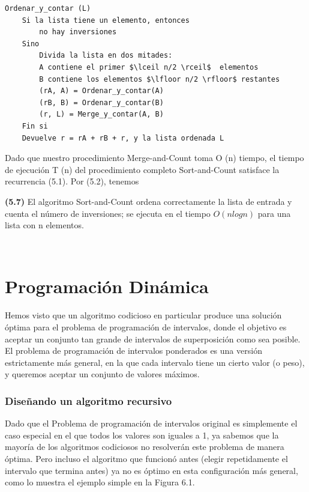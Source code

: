 \documentclass[a4paper, 12pt]{book}
\theoremstyle{dotless}
\begin{document}
\begin{lstlisting}
Ordenar_y_contar (L)
    Si la lista tiene un elemento, entonces
        no hay inversiones
    Sino
        Divida la lista en dos mitades:
        A contiene el primer $\lceil n/2 \rceil$  elementos
        B contiene los elementos $\lfloor n/2 \rfloor$ restantes
        (rA, A) = Ordenar_y_contar(A)
        (rB, B) = Ordenar_y_contar(B)
        (r, L) = Merge_y_contar(A, B)
    Fin si
    Devuelve r = rA + rB + r, y la lista ordenada L
\end{lstlisting}

Dado que nuestro procedimiento Merge-and-Count toma O (n) tiempo, el tiempo de ejecución T (n) del procedimiento completo Sort-and-Count satisface la recurrencia (5.1). Por (5.2), tenemos\\


\colorbox{mygray}{\parbox{15cm}{
\textbf{(5.7)} El algoritmo Sort-and-Count ordena correctamente la lista de entrada y cuenta el número de inversiones; se ejecuta en el tiempo $O (n log n)$ para una lista con n elementos.}}\\

\newpage

\chapter{Programación Dinámica}

Hemos visto que un algoritmo codicioso en particular produce una solución óptima para el problema de programación de intervalos, donde el objetivo es aceptar un conjunto tan grande de intervalos de superposición como sea posible. El problema de programación de intervalos ponderados es una versión estrictamente más general, en la que cada intervalo tiene un cierto valor (o peso), y queremos aceptar un conjunto de valores máximos.\\

\subsection{Diseñando un algoritmo recursivo}

Dado que el Problema de programación de intervalos original es simplemente el caso especial en el que todos los valores son iguales a 1, ya sabemos que la mayoría de los algoritmos codiciosos no resolverán este problema de manera óptima. Pero incluso el algoritmo que funcionó antes (elegir repetidamente el intervalo que termina antes) ya no es óptimo en esta configuración más general, como lo muestra el ejemplo simple en la Figura 6.1.\\
\end{document}
